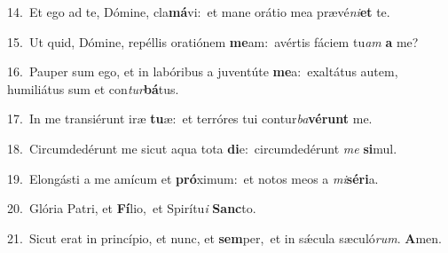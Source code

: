 {\numbfont\textcolor{\numbcolor}{14.}}~Et ego ad te, Dómine, cla\-\textbf{má}\-vi:~\star et mane orátio mea prævé\-\textit{ni}\-\textbf{et} te.\par
{\numbfont\textcolor{\numbcolor}{15.}}~Ut quid, Dómine, repéllis oratiónem \textbf{me}\-am:~\star avértis fáciem tu\textit{am} \textbf{a} me?\par
{\numbfont\textcolor{\numbcolor}{16.}}~Pauper sum ego, et in labóribus a juventúte \textbf{me}\-a:~\star exaltátus autem, humiliátus sum et con\-\textit{tur}\-\textbf{bá}tus.\par
{\numbfont\textcolor{\numbcolor}{17.}}~In me transiérunt iræ \textbf{tu}\-æ:~\star et terróres tui contur\-\textit{ba}\-\textbf{vé}\textbf{runt} me.\par
{\numbfont\textcolor{\numbcolor}{18.}}~Circumdedérunt me sicut aqua tota \textbf{di}\-e:~\star circumdedérunt \textit{me} \textbf{si}\-mul.\par
{\numbfont\textcolor{\numbcolor}{19.}}~Elongásti a me amícum et \textbf{pró}\-ximum:~\star et notos meos a \textit{mi}\-\textbf{sé}\textbf{ri}a.\par
{\numbfont\textcolor{\numbcolor}{20.}}~Glória Patri, et \textbf{Fí}\-lio,~\star et Spirítu\textit{i} \textbf{Sanc}\-to.\par
{\numbfont\textcolor{\numbcolor}{21.}}~Sicut erat in princípio, et nunc, et \textbf{sem}\-per,~\star et in sǽcula sæculó\-\textit{rum}\-. \textbf{A}\-men.\par
